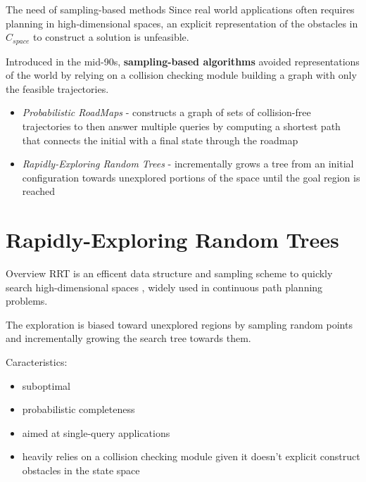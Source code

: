 \documentclass[10pt, xcolor=table]{beamer}
\begin{document}
\begin{frame}{The need of sampling-based methods}
Since real world applications often requires planning in high-dimensional spaces, an \alert{explicit representation} of the obstacles in $C_{space}$ to construct a solution is \alert{unfeasible}. 

Introduced in the mid-90s, \textbf{sampling-based algorithms} avoided representations of the world by relying on a \alert{collision checking module} building a graph with only the feasible trajectories.

\begin{itemize}
\item \textit{Probabilistic RoadMaps} - constructs a graph of sets of collision-free trajectories to then answer multiple queries by computing a shortest path that connects the initial with a final state through the roadmap \cite{karaman2011sampling}
\item \textit{Rapidly-Exploring Random Trees} - incrementally grows a tree from an initial configuration towards unexplored portions of the space until the goal region is reached 
\end{itemize}

\end{frame}

\section{Rapidly-Exploring Random Trees}

\begin{frame}{Overview}
RRT is an efficent \alert{data structure} and \alert{sampling scheme} to quickly search high-dimensional spaces \cite{lavalle2000rapidly}, widely used in \alert{continuous} path planning problems. 

The exploration is biased toward unexplored regions by sampling random points and incrementally growing the search tree towards them.

Caracteristics:
\begin{itemize}
\item suboptimal 
\item probabilistic completeness
\item aimed at single-query applications
\item heavily relies on a collision checking module given it doesn't explicit construct obstacles in the state space
\end{itemize}
\end{frame}
\end{document}
